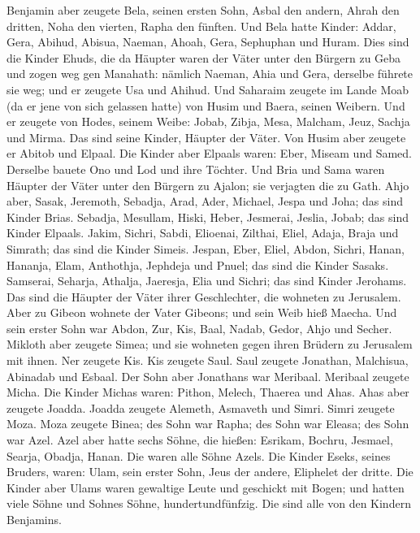  Benjamin aber zeugete Bela, seinen ersten Sohn, Asbal den
andern, Ahrah den dritten,  Noha den vierten, Rapha den
fünften.  Und Bela hatte Kinder: Addar, Gera, Abihud,
 Abisua, Naeman, Ahoah,  Gera, Sephuphan und
Huram.  Dies sind die Kinder Ehuds, die da Häupter waren der
Väter unter den Bürgern zu Geba und zogen weg gen Manahath: 
nämlich Naeman, Ahia und Gera, derselbe führete sie weg; und er zeugete
Usa und Ahihud.  Und Saharaim zeugete im Lande Moab (da er
jene von sich gelassen hatte) von Husim und Baera, seinen Weibern.
 Und er zeugete von Hodes, seinem Weibe: Jobab, Zibja, Mesa,
Malcham,  Jeuz, Sachja und Mirma. Das sind seine Kinder,
Häupter der Väter.  Von Husim aber zeugete er Abitob und
Elpaal.  Die Kinder aber Elpaals waren: Eber, Miseam und
Samed. Derselbe bauete Ono und Lod und ihre Töchter.  Und
Bria und Sama waren Häupter der Väter unter den Bürgern zu Ajalon; sie
verjagten die zu Gath.  Ahjo aber, Sasak, Jeremoth,
 Sebadja, Arad, Ader,  Michael, Jespa und
Joha; das sind Kinder Brias.  Sebadja, Mesullam, Hiski,
Heber,  Jesmerai, Jeslia, Jobab; das sind Kinder Elpaals.
 Jakim, Sichri, Sabdi,  Elioenai, Zilthai,
Eliel,  Adaja, Braja und Simrath; das sind die Kinder
Simeis.  Jespan, Eber, Eliel,  Abdon, Sichri,
Hanan,  Hananja, Elam, Anthothja,  Jephdeja
und Pnuel; das sind die Kinder Sasaks.  Samserai, Seharja,
Athalja,  Jaeresja, Elia und Sichri; das sind Kinder
Jerohams.  Das sind die Häupter der Väter ihrer
Geschlechter, die wohneten zu Jerusalem.  Aber zu Gibeon
wohnete der Vater Gibeons; und sein Weib hieß Maecha.  Und
sein erster Sohn war Abdon, Zur, Kis, Baal, Nadab,  Gedor,
Ahjo und Secher.  Mikloth aber zeugete Simea; und sie
wohneten gegen ihren Brüdern zu Jerusalem mit ihnen.  Ner
zeugete Kis. Kis zeugete Saul. Saul zeugete Jonathan, Malchisua,
Abinadab und Esbaal.  Der Sohn aber Jonathans war Meribaal.
Meribaal zeugete Micha.  Die Kinder Michas waren: Pithon,
Melech, Thaerea und Ahas.  Ahas aber zeugete Joadda. Joadda
zeugete Alemeth, Asmaveth und Simri. Simri zeugete Moza. 
Moza zeugete Binea; des Sohn war Rapha; des Sohn war Eleasa; des Sohn
war Azel.  Azel aber hatte sechs Söhne, die hießen:
Esrikam, Bochru, Jesmael, Searja, Obadja, Hanan. Die waren alle Söhne
Azels.  Die Kinder Eseks, seines Bruders, waren: Ulam, sein
erster Sohn, Jeus der andere, Eliphelet der dritte.  Die
Kinder aber Ulams waren gewaltige Leute und geschickt mit Bogen; und
hatten viele Söhne und Sohnes Söhne, hundertundfünfzig. Die sind alle
von den Kindern Benjamins.

